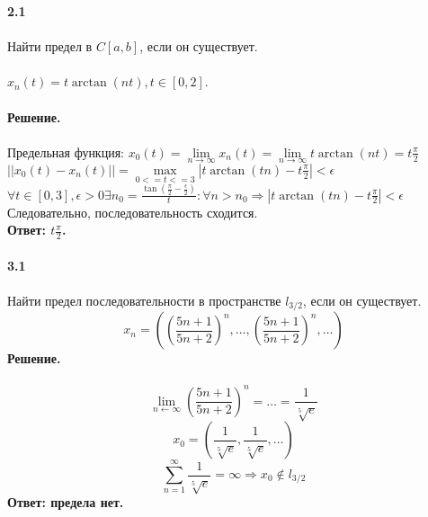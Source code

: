 \documentclass[10pt,a4paper]{article}
\begin{document}
	\noindent\textbf{2.1} \\  \\
	Найти предел в $C[a, b]$, если он существует.\\ \\
	$x_n(t) = t\arctan(nt), t \in [0, 2]$. \\ \\
	\textbf{Решение.} \\ \\
	Предельная функция:
	$x_0(t) = \lim\limits_{n \rightarrow \infty} x_n(t) = \lim\limits_{n \rightarrow \infty} t\arctan(nt) = t \frac{\pi}{2}$\\
	$||x_0(t)-x_n(t)||=\max\limits_{0<=t<=3} |t\arctan(tn) - t\frac{\pi}{2}|<\epsilon$\\
	$\forall t \in [0,3], \epsilon > 0 \exists n_0 = \frac{\tan(\frac{\pi}{2}-\frac{\epsilon}{2})}{t} : \forall n>n_0 \Rightarrow |t\arctan(tn) - t\frac{\pi}{2}|<\epsilon$\\
	Следовательно, последовательность сходится.\\
	\textbf{Ответ: $t\frac{\pi}{2}$.} \\ \\
	
	
	\noindent\textbf{3.1} \\  \\
	Найти предел последовательности в пространстве $l_{3/2}$, если он существует. \\
	$$x_n = \left(\left(\frac{5n + 1}{5n + 2}\right)^n, \dots, \left(\frac{5n + 1}{5n + 2}\right)^n, \dots \right) $$
	\textbf{Решение.} \\ \\
	$$\lim\limits_{n \leftarrow \infty}\left(\frac{5n + 1}{5n + 2}\right)^n = \dots = \frac{1}{\sqrt[5]{e}}$$
	$$x_0 = \left(\frac{1}{\sqrt[5]{e}}, \frac{1}{\sqrt[5]{e}}, \dots \right) $$
	$$\sum_{n = 1}^{\infty} \frac{1}{\sqrt[5]{e}} = \infty \Rightarrow x_0 \notin l_{3/2}$$
	\textbf{Ответ: предела нет.} \\ \\
\end{document}
